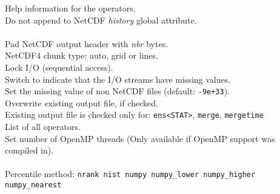 \begin{tabbing}
         \> Help information for the operators. \\
         \> Do not append to NetCDF {\it history} global attribute. \\
         \> \\
\makebox[1.5in][l]{\hspace*{1cm}}
         \> Pad NetCDF output header with {\it nbr} bytes. \\
         \> NetCDF4 chunk type: auto, grid or lines. \\
         \> Lock I/O (sequential access). \\
         \> Switch to indicate that the I/O streams have missing values. \\
         \> Set the missing value of non NetCDF files (default: {\tt-9e+33}). \\
         \> Overwrite existing output file, if checked. \\
         \> Existing output file is checked only for: {\tt ens<STAT>}, {\tt merge}, {\tt mergetime} \\
         \> List of all operators. \\
         \> Set number of OpenMP threads (Only available if OpenMP support was compiled in). \\
         \> \\
\makebox[1.5in][l]{\hspace*{1cm}}
         \> Percentile method: {\tt nrank nist numpy numpy\_lower numpy\_higher numpy\_nearest} \\

\end{tabbing}

